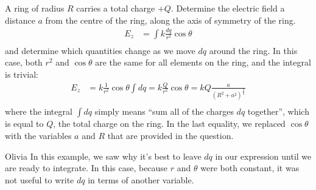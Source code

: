 \begin{example}{\label{ex:chargesfields:ring}A ring of radius $R$ carries a total charge $+Q$. Determine the electric field a distance $a$ from the centre of the ring, along the axis of symmetry of the ring.}
\begin{align*}
E_z &= \int k\frac{dq}{r^2}\cos\theta \\
\end{align*}
and determine which quantities change as we move $dq$ around the ring. In this case, both $r^2$ and $\cos\theta$ are the same for all elements on the ring, and the integral is trivial:
\begin{align*}
E_z &= k\frac{1}{r^2}\cos\theta\int dq=k\frac{Q}{r^2}\cos\theta=kQ\frac{a}{(R^2+a^2)^\frac{3}{2}}  \\
\end{align*}
where the integral $\int dq$ simply means ``sum all of the charges $dq$ together'', which is equal to $Q$, the total charge on the ring. 
In the last equality, we replaced $\cos\theta$ with the variables $a$ and $R$ that are provided in the question.
\end{example}

\begin{studentOpinion}{Olivia}
In this example, we saw why it's best to leave $dq$ in our expression until we are ready to integrate. In this case, because $r$ and $\theta$ were both constant, it was not useful to write $dq$ in terms of another variable. 
\end{studentOpinion}

